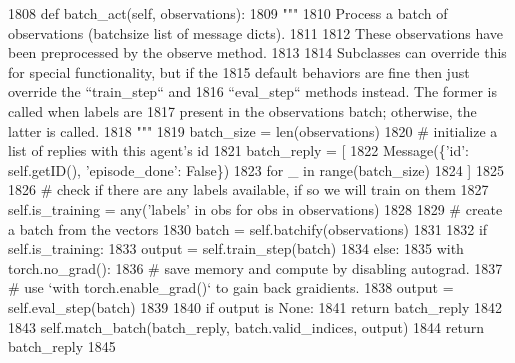 \begin{DoxyCode}
1808     \textcolor{keyword}{def }batch\_act(self, observations):
1809         \textcolor{stringliteral}{"""}
1810 \textcolor{stringliteral}{        Process a batch of observations (batchsize list of message dicts).}
1811 \textcolor{stringliteral}{}
1812 \textcolor{stringliteral}{        These observations have been preprocessed by the observe method.}
1813 \textcolor{stringliteral}{}
1814 \textcolor{stringliteral}{        Subclasses can override this for special functionality, but if the}
1815 \textcolor{stringliteral}{        default behaviors are fine then just override the ``train\_step`` and}
1816 \textcolor{stringliteral}{        ``eval\_step`` methods instead. The former is called when labels are}
1817 \textcolor{stringliteral}{        present in the observations batch; otherwise, the latter is called.}
1818 \textcolor{stringliteral}{        """}
1819         batch\_size = len(observations)
1820         \textcolor{comment}{# initialize a list of replies with this agent's id}
1821         batch\_reply = [
1822             Message(\{\textcolor{stringliteral}{'id'}: self.getID(), \textcolor{stringliteral}{'episode\_done'}: \textcolor{keyword}{False}\})
1823             \textcolor{keywordflow}{for} \_ \textcolor{keywordflow}{in} range(batch\_size)
1824         ]
1825 
1826         \textcolor{comment}{# check if there are any labels available, if so we will train on them}
1827         self.is\_training = any(\textcolor{stringliteral}{'labels'} \textcolor{keywordflow}{in} obs \textcolor{keywordflow}{for} obs \textcolor{keywordflow}{in} observations)
1828 
1829         \textcolor{comment}{# create a batch from the vectors}
1830         batch = self.batchify(observations)
1831 
1832         \textcolor{keywordflow}{if} self.is\_training:
1833             output = self.train\_step(batch)
1834         \textcolor{keywordflow}{else}:
1835             with torch.no\_grad():
1836                 \textcolor{comment}{# save memory and compute by disabling autograd.}
1837                 \textcolor{comment}{# use `with torch.enable\_grad()` to gain back graidients.}
1838                 output = self.eval\_step(batch)
1839 
1840         \textcolor{keywordflow}{if} output \textcolor{keywordflow}{is} \textcolor{keywordtype}{None}:
1841             \textcolor{keywordflow}{return} batch\_reply
1842 
1843         self.match\_batch(batch\_reply, batch.valid\_indices, output)
1844         \textcolor{keywordflow}{return} batch\_reply
1845 
\end{DoxyCode}
\mbox{\label{classparlai_1_1core_1_1torch__agent_1_1TorchAgent_a4c5824776df0c6cf995984a5e7a3f433}} 

